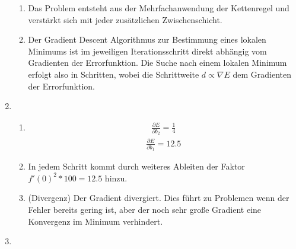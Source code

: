 \documentclass{article}
\begin{document}
\begin{enumerate}
\begin{enumerate}[label=\alph*)]
          \item Das Problem entsteht aus der Mehrfachanwendung der Kettenregel und verstärkt sich mit jeder zusätzlichen Zwischenschicht.
          \item Der Gradient Descent Algorithmus zur Bestimmung eines lokalen Minimums ist im jeweiligen Iterationsschritt direkt abhängig vom Gradienten der Errorfunktion. Die Suche nach einem lokalen Minimum erfolgt also in Schritten, wobei die Schrittweite $d \propto \nabla E$ dem Gradienten der Errorfunktion.
        \end{enumerate}
  \item
        \begin{enumerate}[label=\alph*)]
          \item
                \begin{align*}
                  \frac{\partial E}{\partial b_2} = \frac{1}{4}
                \end{align*}
                \begin{align*}
                  \frac{\partial E}{\partial b_1} = 12.5
                \end{align*}
          \item {}
                In jedem Schritt kommt durch weiteres Ableiten der Faktor $f'(0)^2*100=12.5$ hinzu.
          \item \todo[inline]{}(Divergenz)
                Der Gradient divergiert. Dies führt zu Problemen wenn der Fehler bereits gering ist, aber der noch sehr große Gradient eine Konvergenz im Minimum verhindert.
        \end{enumerate}
  \item \todo[inline]{}
\end{enumerate}
\end{document}
